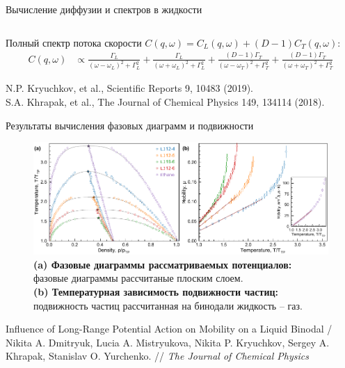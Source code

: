 \documentclass{beamer}
\begin{document}
\begin{frame}{Вычисление диффузии и спектров в жидкости}
{\begin{columns}
\begin{column}{0.5\linewidth}
\end{column}
\end{columns}


\vspace{0.5cm}

Полный спектр потока скорости $C(q, \omega) = C_L(q, \omega) + (D-1)C_T(q, \omega)$:
\begin{equation}
    \begin{aligned}
    C(q, \omega) & \propto \frac{\Gamma_{L}}{\left(\omega-\omega_{L}\right)^{2}+\Gamma_{L}^{2}}+\frac{\Gamma_{L}}{\left(\omega+\omega_{L}\right)^{2}+\Gamma_{L}^{2}}+\frac{(D-1) \Gamma_{T}}{\left(\omega-\omega_{T}\right)^{2}+\Gamma_{T}^{2}}+\frac{(D-1) \Gamma_{T}}{\left(\omega+\omega_{T}\right)^{2}+\Gamma_{T}^{2}}
\end{aligned}
\label{eq5}
\end{equation}

}

\vspace{1.0cm}
\tiny{N.P. Kryuchkov, et al., Scientific Reports 9, 10483 (2019). \\
S.A. Khrapak, et al., The Journal of Chemical Physics 149, 134114 (2018).}

\end{frame}












\begin{frame}{Результаты вычисления фазовых диаграмм и подвижности}
\footnotesize{
\begin{figure}
    \centering
    \includegraphics[width=\textwidth]{MACR-Figure3}
    \caption{\footnotesize{\textbf{(a) Фазовые диаграммы рассматриваемых потенциалов:} фазовые диаграммы рассчитаные плоским слоем.\\
 \textbf{(b) Температурная зависимость подвижности частиц:} подвижность частиц рассчитанная на бинодали жидкость -- газ.}}
\end{figure}

}

\tiny{Influence of Long-Range Potential Action on Mobility on a Liquid Binodal / Nikita A. Dmitryuk, Lucia A. Mistryukova, Nikita P. Kryuchkov, Sergey A. Khrapak, Stanislav O. Yurchenko. // \textit{The Journal of Chemical Physics}}

\end{frame}
\end{document}
